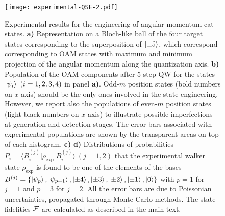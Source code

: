 
\begin{figure}[t!]
\texttt{[image: experimental-QSE-2.pdf]}
\caption{
	Experimental results for the engineering of angular momentum cat states. {\bf a)} Representation on a Bloch-like ball of the four target states corresponding to the superposition of $\ket{\pm 5}$, which correspond corresponding to OAM states with maximum and minimum projection of the angular momentum along the quantization axis. {\bf b)} Population of the OAM components after 5-step {QW} for the states $\ket{\psi_i}~(i=1,2,3,4)$ in panel {\bf a)}. Odd-$m$ position states (bold numbers on $x$-axis) should be the only ones involved in the state engineering. However, we report also the populations of even-$m$ position states (light-black numbers on $x$-axis) to illustrate possible imperfections at generation and detection stages. The error bars associated with experimental populations are shown by the transparent areas on top of each histogram. {\bf c)}-{\bf d)} Distributions of probabilities $P_i=\langle B^{(j)}_i\vert\rho_\text{exp}\vert B^{(j)}_i\rangle~(j=1,2)$ that the experimental walker state $\rho_\text{exp}$ is found to be one of the elements of the bases $B^{(j)}=\{\ket{\psi_p},\ket{\psi_{p+1}},\ket{\pm4},\ket{\pm3},\ket{\pm2},\ket{\pm1},\ket{0}\}$ with $p=1$ for $j=1$ and $p=3$ for $j=2$. All the error bars are due to Poissonian uncertainties, propagated through Monte Carlo methods. The state fidelities ${\cal F}$ are calculated as described in the main text.
}
\label{fig:expQWs:results}
\end{figure}


